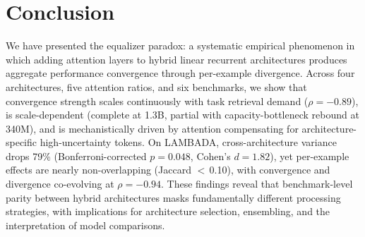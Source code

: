 \documentclass[11pt,a4paper]{article}
\begin{document}
\section{Conclusion}

We have presented the equalizer paradox: a systematic empirical phenomenon in which adding attention layers to hybrid linear recurrent architectures produces aggregate performance convergence through per-example divergence.
Across four architectures, five attention ratios, and six benchmarks, we show that convergence strength scales continuously with task retrieval demand ($\rho{=}{-}0.89$), is scale-dependent (complete at 1.3B, partial with capacity-bottleneck rebound at 340M), and is mechanistically driven by attention compensating for architecture-specific high-uncertainty tokens.
On LAMBADA, cross-architecture variance drops 79\% (Bonferroni-corrected $p{=}0.048$, Cohen's $d{=}1.82$), yet per-example effects are nearly non-overlapping (Jaccard $<$\,0.10), with convergence and divergence co-evolving at $\rho{=}{-}0.94$.
These findings reveal that benchmark-level parity between hybrid architectures masks fundamentally different processing strategies, with implications for architecture selection, ensembling, and the interpretation of model comparisons.



\end{document}
